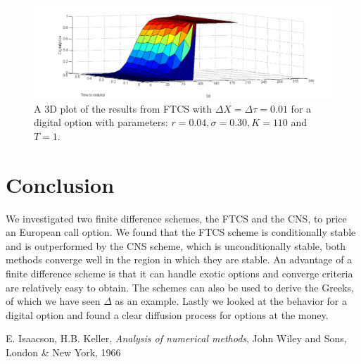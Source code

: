 \documentclass[11pt,a4paper]{article}
\begin{document}
\begin{figure}[h]
\begin{center}
\includegraphics[scale=0.40]{3DD.png}
\end{center}
\caption{A 3D plot of the results from FTCS with $\Delta X = \Delta \tau = 0.01$ for a digital option with parameters: $r = 0.04, \sigma = 0.30, K = 110$ and $T = 1$.}
\label{fig:3dd}
\end{figure}

\section{Conclusion}
We investigated two finite difference schemes, the FTCS and the CNS, to price an European call option. We found that the FTCS scheme is conditionally stable and is outperformed by the CNS scheme, which is unconditionally stable, both methods converge well in the region in which they are stable. An advantage of a finite difference scheme is that it can handle exotic options and converge criteria are relatively easy to obtain. The schemes can also be used to derive the Greeks, of which we have seen $\Delta$ as an example. Lastly we looked at the behavior for a digital option and found a clear diffusion process for options at the money.

\begin{thebibliography}{10}
  E. Isaacson, H.B. Keller, \emph{Analysis of numerical methods}, John Wiley and Sons, London \& New York, 1966 
\end{thebibliography}
\end{document}
